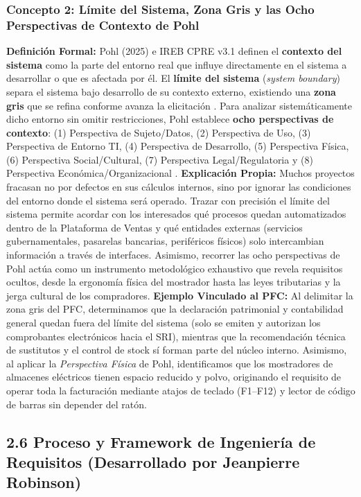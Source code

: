 \subsubsection{Concepto 2: Límite del Sistema, Zona Gris y las Ocho Perspectivas de Contexto de Pohl}
\textbf{Definición Formal:} Pohl (2025) \cite{pohl2025} e IREB CPRE v3.1 \cite{ireb2023} definen el \textbf{contexto del sistema} como la parte del entorno real que influye directamente en el sistema a desarrollar o que es afectada por él. El \textbf{límite del sistema} (\textit{system boundary}) separa el sistema bajo desarrollo de su contexto externo, existiendo una \textbf{zona gris} que se refina conforme avanza la elicitación \cite{pohl2025}. Para analizar sistemáticamente dicho entorno sin omitir restricciones, Pohl establece \textbf{ocho perspectivas de contexto}: (1) Perspectiva de Sujeto/Datos, (2) Perspectiva de Uso, (3) Perspectiva de Entorno TI, (4) Perspectiva de Desarrollo, (5) Perspectiva Física, (6) Perspectiva Social/Cultural, (7) Perspectiva Legal/Regulatoria y (8) Perspectiva Económica/Organizacional \cite{pohl2025}.
\textbf{Explicación Propia:} Muchos proyectos fracasan no por defectos en sus cálculos internos, sino por ignorar las condiciones del entorno donde el sistema será operado. Trazar con precisión el límite del sistema permite acordar con los interesados qué procesos quedan automatizados dentro de la Plataforma de Ventas y qué entidades externas (servicios gubernamentales, pasarelas bancarias, periféricos físicos) solo intercambian información a través de interfaces. Asimismo, recorrer las ocho perspectivas de Pohl actúa como un instrumento metodológico exhaustivo que revela requisitos ocultos, desde la ergonomía física del mostrador hasta las leyes tributarias y la jerga cultural de los compradores.
\textbf{Ejemplo Vinculado al PFC:} Al delimitar la zona gris del PFC, determinamos que la declaración patrimonial y contabilidad general quedan fuera del límite del sistema (solo se emiten y autorizan los comprobantes electrónicos hacia el SRI), mientras que la recomendación técnica de sustitutos y el control de stock sí forman parte del núcleo interno. Asimismo, al aplicar la \textit{Perspectiva Física} de Pohl, identificamos que los mostradores de almacenes eléctricos tienen espacio reducido y polvo, originando el requisito de operar toda la facturación mediante atajos de teclado (F1--F12) y lector de código de barras sin depender del ratón.
\subsection{2.6 Proceso y Framework de Ingeniería de Requisitos (Desarrollado por Jeanpierre Robinson)}

